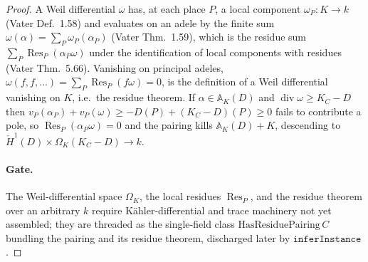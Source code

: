\begin{proof}
  A Weil differential \(\omega\) has, at each place \(P\), a local
  component \(\omega_P \colon K \to k\) (Vater Def.~1.58) and evaluates on
  an adele by the finite sum
  \(\omega(\alpha) = \sum_P \omega_P(\alpha_P)\) (Vater Thm.~1.59), which
  is the residue sum \(\sum_P \operatorname{Res}_P(\alpha_P \omega)\)
  under the identification of local components with residues (Vater
  Thm.~5.66). Vanishing on principal adeles,
  \(\omega(f, f, \dots) = \sum_P \operatorname{Res}_P(f\omega) = 0\), is
  the definition of a Weil differential vanishing on \(K\), i.e.\ the
  residue theorem. If \(\alpha \in \mathbb{A}_K(D)\) and
  \(\operatorname{div}\omega \ge K_C - D\) then
  \(v_P(\alpha_P) + v_P(\omega) \ge -D(P) + (K_C - D)(P) \ge 0\) fails to
  contribute a pole, so \(\operatorname{Res}_P(\alpha_P\omega) = 0\) and
  the pairing kills \(\mathbb{A}_K(D) + K\), descending to
  \(\check{H}^1(D) \times \Omega_K(K_C - D) \to k\).
  \paragraph{Gate.} The Weil-differential space \(\Omega_K\), the local
  residues \(\operatorname{Res}_P\), and the residue theorem over an
  arbitrary \(k\) require Kähler-differential and trace machinery not yet
  assembled; they are threaded as the single-field class
  \(\mathrm{HasResiduePairing}\, C\) bundling the pairing and its residue
  theorem, discharged later by \(\texttt{inferInstance}\).
\end{proof}


